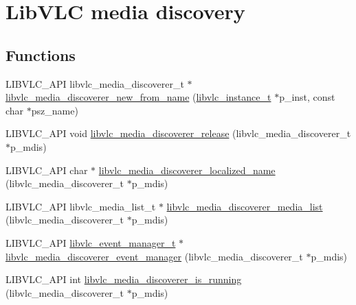 \hypertarget{group__libvlc__media__discoverer}{}\section{Lib\+V\+LC media discovery}
\label{group__libvlc__media__discoverer}
\subsection*{Functions}
\begin{DoxyCompactItemize}
\item 
L\+I\+B\+V\+L\+C\+\_\+\+A\+PI libvlc\+\_\+media\+\_\+discoverer\+\_\+t $\ast$ \hyperlink{group__libvlc__media__discoverer_gacf768ef894b3d9eb3f655bdc31a31f66}{libvlc\+\_\+media\+\_\+discoverer\+\_\+new\+\_\+from\+\_\+name} (\hyperlink{group__libvlc__core_ga316d739a80da4678206c79f4d6c2e284}{libvlc\+\_\+instance\+\_\+t} $\ast$p\+\_\+inst, const char $\ast$psz\+\_\+name)
\item 
L\+I\+B\+V\+L\+C\+\_\+\+A\+PI void \hyperlink{group__libvlc__media__discoverer_ga44bb5d3112f1844c420660ac50f03e1b}{libvlc\+\_\+media\+\_\+discoverer\+\_\+release} (libvlc\+\_\+media\+\_\+discoverer\+\_\+t $\ast$p\+\_\+mdis)
\item 
L\+I\+B\+V\+L\+C\+\_\+\+A\+PI char $\ast$ \hyperlink{group__libvlc__media__discoverer_ga27a1fcfeceedcb2649a92c83f7081617}{libvlc\+\_\+media\+\_\+discoverer\+\_\+localized\+\_\+name} (libvlc\+\_\+media\+\_\+discoverer\+\_\+t $\ast$p\+\_\+mdis)
\item 
L\+I\+B\+V\+L\+C\+\_\+\+A\+PI libvlc\+\_\+media\+\_\+list\+\_\+t $\ast$ \hyperlink{group__libvlc__media__discoverer_gad6a6daa2d4a4ce2634969380b4b6151c}{libvlc\+\_\+media\+\_\+discoverer\+\_\+media\+\_\+list} (libvlc\+\_\+media\+\_\+discoverer\+\_\+t $\ast$p\+\_\+mdis)
\item 
L\+I\+B\+V\+L\+C\+\_\+\+A\+PI \hyperlink{group__libvlc__event_gaa82f247503d3558b9117550e8d3c9259}{libvlc\+\_\+event\+\_\+manager\+\_\+t} $\ast$ \hyperlink{group__libvlc__media__discoverer_ga60cca8ee74b3dd433f447436ca3e2578}{libvlc\+\_\+media\+\_\+discoverer\+\_\+event\+\_\+manager} (libvlc\+\_\+media\+\_\+discoverer\+\_\+t $\ast$p\+\_\+mdis)
\item 
L\+I\+B\+V\+L\+C\+\_\+\+A\+PI int \hyperlink{group__libvlc__media__discoverer_gaa4cd385d67fd8099a23209d2245ddd16}{libvlc\+\_\+media\+\_\+discoverer\+\_\+is\+\_\+running} (libvlc\+\_\+media\+\_\+discoverer\+\_\+t $\ast$p\+\_\+mdis)
\end{DoxyCompactItemize}


